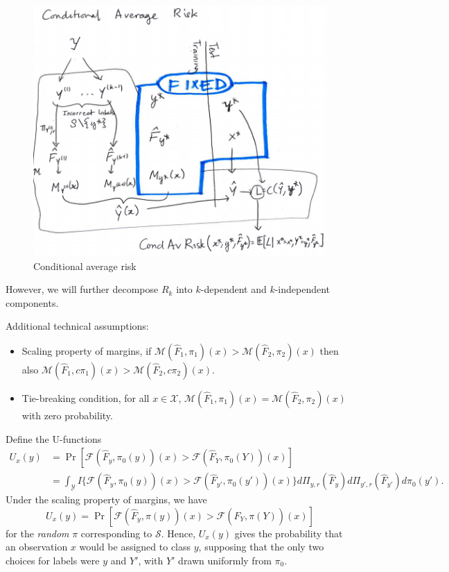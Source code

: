 \documentclass[12pt]{article}
\begin{document}
\begin{figure}[h]
\centering
\includegraphics[scale = 0.4]{extrapolation_figures/conditional_risk.png}
\caption{Conditional average risk}\label{fig:conditional_risk}
\end{figure}

However, we will further decompose $R_k$ into $k$-dependent and $k$-independent components.

Additional technical assumptions:
\begin{itemize}
\item 
Scaling property of margins, if $\mathcal{M}(\hat{F}_1, \pi_1)(x) >
\mathcal{M}(\hat{F}_2, \pi_2)(x)$ then also $\mathcal{M}(\hat{F}_1,
c\pi_1)(x) > \mathcal{M}(\hat{F}_2, c\pi_2)(x)$.
\item 
Tie-breaking condition, for all $x \in \mathcal{X}$,
$\mathcal{M}(\hat{F}_1, \pi_1)(x) = \mathcal{M}(\hat{F}_2, \pi_2)(x)$
with zero probability.
\end{itemize}

Define the U-functions
\begin{align}\label{eq:ufunc}
U_x(y) &= \Pr[\mathcal{F}(\hat{F}_y, \pi_0(y))(x) > \mathcal{F}(\hat{F}_Y, \pi_0(Y))(x)]
\\&= \int_{\mathcal{Y}} 
I\{
\mathcal{F}(\hat{F}_y, \pi_0(y))(x) > \mathcal{F}(\hat{F}_{y'}, \pi_0(y'))(x)
\}
d\Pi_{y, r}(\hat{F}_y)
d\Pi_{y', r}(\hat{F}_{y'})
d\pi_0(y').
\end{align}
Under the scaling property of margins, we have
\[
U_x(y) =  \Pr[\mathcal{F}(\hat{F}_y, \pi(y))(x) > \mathcal{F}(\hat{F}_Y, \pi(Y))(x)]
\]
for the \emph{random} $\pi$ corresponding to $\mathcal{S}$.  Hence,
$U_x(y)$ gives the probability that an observation $x$ would be
assigned to class $y$, supposing that the only two choices for labels
were $y$ and $Y'$, with $Y'$ drawn uniformly from $\pi_0$.
\end{document}
